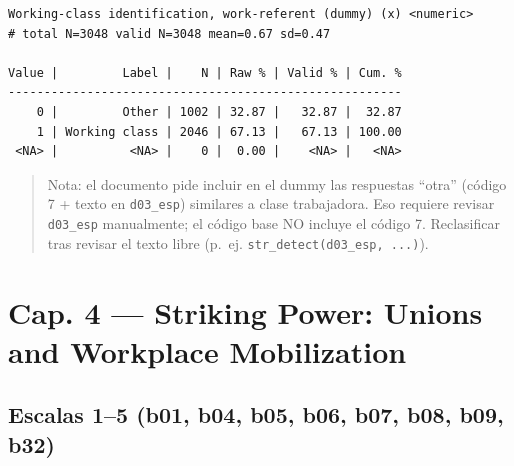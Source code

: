 \documentclass[
  letterpaper,
  DIV=11,
  numbers=noendperiod]{scrreprt}
\newenvironment{Shaded}{\begin{snugshade}}{\end{snugshade}}
\newcommand{\FunctionTok}[1]{\textcolor[rgb]{0.28,0.35,0.67}{#1}}
\newcommand{\NormalTok}[1]{\textcolor[rgb]{0.00,0.23,0.31}{#1}}
\newcommand{\SpecialCharTok}[1]{\textcolor[rgb]{0.37,0.37,0.37}{#1}}
\begin{document}
\begin{Shaded}
\end{Shaded}

\begin{verbatim}
Working-class identification, work-referent (dummy) (x) <numeric> 
# total N=3048 valid N=3048 mean=0.67 sd=0.47

Value |         Label |    N | Raw % | Valid % | Cum. %
-------------------------------------------------------
    0 |         Other | 1002 | 32.87 |   32.87 |  32.87
    1 | Working class | 2046 | 67.13 |   67.13 | 100.00
 <NA> |          <NA> |    0 |  0.00 |    <NA> |   <NA>
\end{verbatim}

\begin{quote}
Nota: el documento pide incluir en el dummy las respuestas ``otra''
(código 7 + texto en \texttt{d03\_esp}) similares a clase trabajadora.
Eso requiere revisar \texttt{d03\_esp} manualmente; el código base NO
incluye el código 7. Reclasificar tras revisar el texto libre (p.~ej.
\texttt{str\_detect(d03\_esp,\ ...)}).
\end{quote}

\section{Cap. 4 --- Striking Power: Unions and Workplace
Mobilization}\label{cap.-4-striking-power-unions-and-workplace-mobilization}

\subsection{Escalas 1--5 (b01, b04, b05, b06, b07, b08, b09,
b32)}\label{escalas-15-b01-b04-b05-b06-b07-b08-b09-b32}
\end{document}
